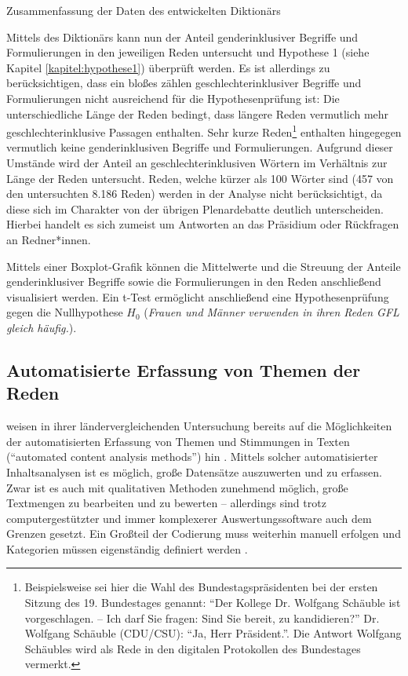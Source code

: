 \documentclass[12pt, 
    twoside=false, 
    bibliography=totoc, 
    numbers=endperiod, 
    headings=normal, 
    toc=chapterentrydotfill
    ]{scrbook}
\begin{document}
\begin{table}[htb]
    \centering
    \caption[Zusammenfassung der Daten des entwickelten Diktionärs]{Zusammenfassung der Daten des entwickelten Diktionärs}
    
    \label{table:zusammenfassung_dict}
\end{table}

Mittels des Diktionärs kann nun der Anteil genderinklusiver Begriffe und Formulierungen in den jeweiligen Reden untersucht und Hypothese 1 (siehe Kapitel \ref{kapitel:hypothese1}) überprüft werden. Es ist allerdings zu berücksichtigen, dass ein bloßes zählen geschlechterinklusiver Begriffe und Formulierungen nicht ausreichend für die Hypothesenprüfung ist:
Die unterschiedliche Länge der Reden bedingt, dass längere Reden vermutlich mehr geschlechterinklusive Passagen enthalten. Sehr kurze Reden\footnote{Beispielsweise sei hier die Wahl des Bundestagspräsidenten bei der ersten Sitzung des 19. Bundestages genannt: \enquote{Der Kollege Dr. Wolfgang Schäuble ist vorgeschlagen. -- Ich darf Sie fragen: Sind Sie bereit, zu kandidieren?} Dr. Wolfgang Schäuble (CDU/CSU): \enquote{Ja, Herr Präsident.}. Die Antwort Wolfgang Schäubles wird als Rede in den digitalen Protokollen des Bundestages vermerkt.} enthalten hingegegen vermutlich keine genderinklusiven Begriffe und Formulierungen. Aufgrund dieser Umstände wird der Anteil an geschlechterinklusiven Wörtern im Verhältnis zur Länge der Reden untersucht. 
Reden, welche kürzer als 100 Wörter sind (457 von den untersuchten 8.186 Reden) werden in der Analyse nicht berücksichtigt, da diese sich im Charakter von der übrigen Plenardebatte deutlich unterscheiden. Hierbei handelt es sich zumeist um Antworten an das Präsidium oder Rückfragen an Redner*innen.

Mittels einer Boxplot-Grafik können die Mittelwerte und die Streuung der Anteile genderinklusiver Begriffe sowie die Formulierungen in den Reden anschließend visualisiert werden. Ein t-Test \parencite[vgl.][164ff.]{diaz-bone_2018} ermöglicht anschließend eine Hypothesenprüfung gegen die Nullhypothese $H_0$ (\emph{Frauen und Männer verwenden in ihren Reden GFL gleich häufig.}).

\subsection{Automatisierte Erfassung von Themen der Reden} \label{kapitel:methode_inhalte}

\citeauthor{back_2018} weisen in ihrer ländervergleichenden Untersuchung bereits auf die Möglichkeiten der automatisierten Erfassung von Themen und Stimmungen in Texten (\enquote{automated
content analysis methods}) hin \parencite*[18]{back_2018}. Mittels solcher automatisierter Inhaltsanalysen ist es möglich, große Datensätze auszuwerten und zu erfassen. Zwar ist es auch mit qualitativen Methoden zunehmend möglich, große Textmengen zu bearbeiten und zu bewerten \parencite[vgl.][]{raediker_2019} -- allerdings sind trotz computergestützter und immer komplexerer Auswertungssoftware auch dem Grenzen gesetzt. Ein Großteil der Codierung muss weiterhin manuell erfolgen und Kategorien müssen eigenständig definiert werden \parencite[52f.]{raediker_2019}. 
\end{document}
